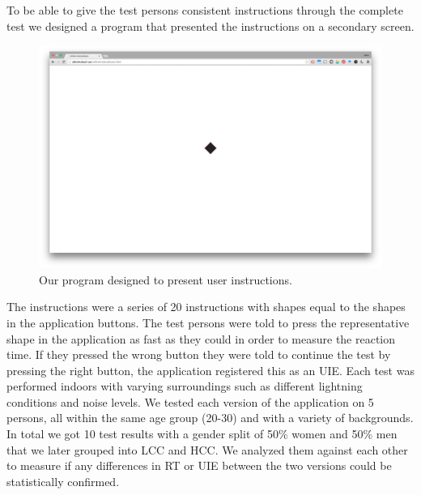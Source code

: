 \documentclass[runningheads,a4paper]{llncs}
\begin{document}
To be able to give the test persons consistent instructions through the complete test we designed a program that presented the instructions on a secondary screen. 
\begin{figure}
	\centering
	\includegraphics[width=\textwidth]{instructions}
	\caption{Our program designed to present user instructions.
	\label{fig:instructions}}
\end{figure}
The instructions were a series of 20 instructions with shapes equal to the shapes in the application buttons. The test persons were told to press the representative shape in the application as fast as they could in order to measure the reaction time. If they pressed the wrong button they were told to continue the test by pressing the right button, the application registered this as an UIE. Each test was performed indoors with varying surroundings such as different lightning conditions and noise levels. We tested each version of the application on 5 persons, all within the same age group (20-30) and with a variety of backgrounds. In total we got 10 test results with a gender split of 50\% women and 50\% men that we later grouped into LCC and HCC. We analyzed them against each other to measure if any differences in RT or UIE between the two versions could be statistically confirmed.
\end{document}
